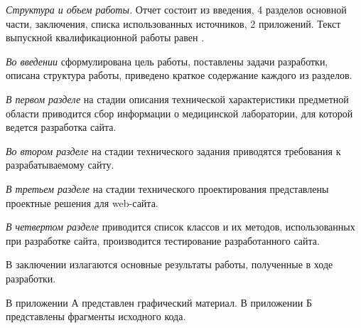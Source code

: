 \emph{Структура и объем работы.} Отчет состоит из введения, 4 разделов основной части, заключения, списка использованных источников, 2 приложений. Текст выпускной квалификационной работы равен .

\emph{Во введении} сформулирована цель работы, поставлены задачи разработки, описана структура работы, приведено краткое содержание каждого из разделов.

\emph{В первом разделе} на стадии описания технической характеристики предметной области приводится сбор информации о медицинской лаборатории, для которой ведется разработка сайта.

\emph{Во втором разделе} на стадии технического задания приводятся требования к разрабатываемому сайту.

\emph{В третьем разделе} на стадии технического проектирования представлены проектные решения для web-сайта.

\emph{В четвертом разделе} приводится список классов и их методов, использованных при разработке сайта, производится тестирование разработанного сайта.

В заключении излагаются основные результаты работы, полученные в ходе разработки.

В приложении А представлен графический материал.
В приложении Б представлены фрагменты исходного кода. 
